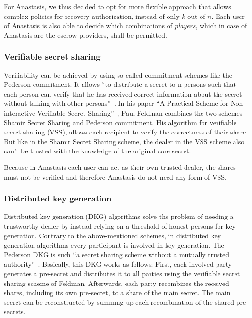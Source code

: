 For Anastasis, we thus decided to opt for more flexible approach that
allows complex policies for recovery authorization, instead of only
$k$-out-of-$n$. Each user of Anastasis is also able to decide which
combinations of \textit{players}, which in case of Anastasis are the 
escrow providers, shall be permitted.

\subsubsection{Verifiable secret sharing}

Verifiability can be achieved by using so called commitment schemes
like the Pederson commitment. It allows ``to distribute a secret to n
persons such that each person can verify that he has received correct
information about the secret without talking with other
persons''~\cite{pedersen_sharing_0}. In his paper ``A Practical Scheme
for Non-interactive Verifiable Secret
Sharing''~\cite{feldman_sharing}, Paul Feldman combines the two
schemes Shamir Secret Sharing and Pederson commitment. His algorithm
for verifiable secret sharing (VSS), allows each recipient to
verify the correctness of their share. But like in the Shamir Secret
Sharing scheme, the dealer in the VSS scheme
also can't be trusted with the knowledge of the original core secret.

Because in Anastasis each user can act as their own trusted dealer,
the shares must not be verified and therefore Anastasis do not need
any form of VSS.

\subsubsection{Distributed key generation}

Distributed key generation (DKG) algorithms solve the problem of
needing a trustworthy dealer by instead relying on a threshold of
honest persons for key generation. Contrary to the above-mentioned
schemes, in distributed key generation algorithms every participant is
involved in key generation.  The Pederson DKG is such ``a secret
sharing scheme without a mutually trusted
authority''~\cite{pedersen_sharing_5.2}. Basically, this DKG works as
follows: First, each involved party generates a pre-secret and
distributes it to all parties using the verifiable secret sharing
scheme of Feldman.  Afterwards, each party recombines the received
shares, including its own pre-secret, to a share of the main
secret. The main secret can be reconstructed by summing up each
recombination of the shared pre-secrets.

